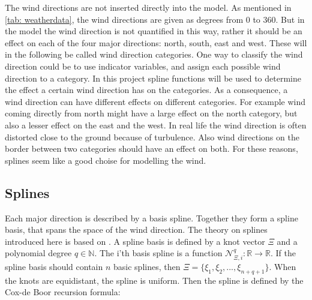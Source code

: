 \noindent The wind directions are not inserted directly into the model. As mentioned in \cref{tab: weatherdata}, the wind directions are given as degrees from $0$ to $360$. But in the model the wind direction is not quantified in this way, rather it should be an effect on each of the four major directions: north, south, east and west. These will in the following be called wind direction categories. One way to classify the wind direction could be to use indicator variables, and assign each possible wind direction to a category. In this project spline functions will be used to determine the effect a certain wind direction has on the categories. As a consequence, a wind direction can have different effects on different categories. For example wind coming directly from north might have a large effect on the north category, but also a lesser effect on the east and the west. In real life the wind direction is often distorted close to the ground because of turbulence. Also wind directions on the border between two categories should have an effect on both. For these reasons, splines seem like a good choise for modelling the wind. \\

\subsection{Splines}
Each major direction is described by a basis spline. Together they form a spline basis, that spans the space of the wind direction. The theory on splines introduced here is based on \cite{Splines}. A spline basis is defined by a knot vector $\Xi$ and a polynomial degree $q\in \mathbb{N}$. The i'th basis spline is a function $\mathcal{N}^q_{\Xi,i}: \mathbb{R} \rightarrow \mathbb{R}$. If the spline basis should contain $n$ basic splines, then $\Xi=\{\xi_1, \xi_2,...,\xi_{n+q+1}\}$. When the knots are equidistant, the spline is uniform. Then the spline is defined by the Cox-de Boor recursion formula:

